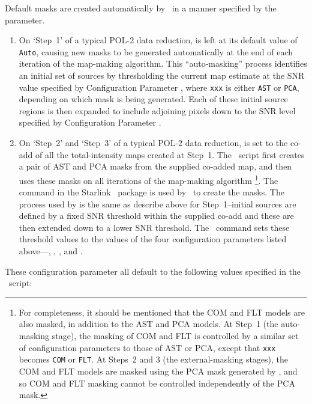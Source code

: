 Default masks are created automatically by \poltwomap\ in a manner specified by the  parameter.

\begin{enumerate}
\item On `Step~1' of a typical POL-2 data reduction,  is left at its default value of
\texttt{Auto}, causing new masks to be generated automatically at the end of each iteration of 
the map-making algorithm. This ``auto-masking'' process identifies an initial set of sources by 
thresholding the current map estimate at the SNR value specified by Configuration Parameter 
, where \texttt{xxx} is either \texttt{AST} or \texttt{PCA}, depending on 
which mask is being generated. Each of these initial source regions is then expanded to include 
adjoining pixels down to the SNR level specified by Configuration Parameter 
.

\item On `Step~2' and `Step~3' of a typical POL-2 data reduction, 
is set to the co-add of all the total-intensity maps created at Step~1. The
\poltwomap\ script first creates a pair of AST and PCA masks from the supplied
co-added map, and then uses these masks on all iterations of the map-making
algorithm \footnote{For completeness, it should be mentioned that the COM and
FLT models are also masked, in addition to the AST and PCA models. At Step~1
(the auto-masking stage), the masking of COM and FLT is controlled by a
similar set of configuration parameters to those of AST or PCA, except that
\texttt{xxx} becomes \texttt{COM} or \texttt{FLT}.  At Steps~2 and 3 (the
external-masking stages), the COM and FLT models are masked using the PCA mask
generated by , and so COM and FLT masking cannot be
controlled independently of the PCA mask.}. The  command in
the Starlink \CUPID\ package is used by \poltwomap\ to create the masks. The
process used by  is the same as describe above for
Step~1--initial sources are defined by a fixed SNR threshold within the
supplied co-add and these are then extended down to a lower SNR threshold. The
\poltwomap\ command sets these threshold values to the values of the four
configuration parameters listed above---,
, , and .

\end{enumerate}

These configuration parameter all default to the following values specified in the \poltwomap\ 
script:

